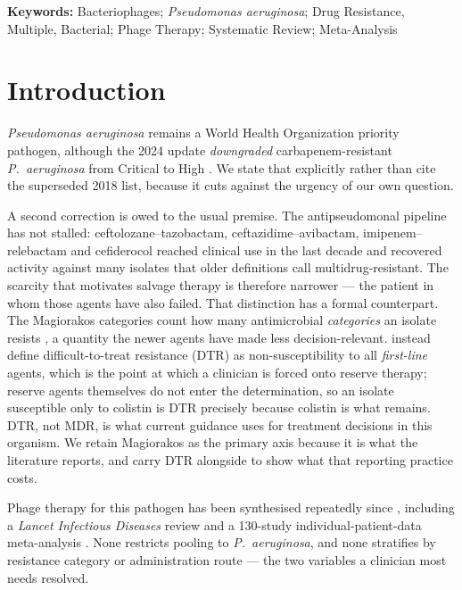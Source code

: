 \documentclass[12pt]{article}
\begin{document}
\vspace{1em}
\noindent\textbf{Keywords:} Bacteriophages; \textit{Pseudomonas aeruginosa}; Drug Resistance, Multiple, Bacterial; Phage Therapy; Systematic Review; Meta-Analysis

\newpage
\setcounter{page}{1}

\section{Introduction}

\textit{Pseudomonas aeruginosa} remains a World Health Organization priority pathogen, although the 2024 update \emph{downgraded} carbapenem-resistant \textit{P.\ aeruginosa} from Critical to High \parencite{WHO2024_bppl,Tacconelli2018_who}. We state that explicitly rather than cite the superseded 2018 list, because it cuts against the urgency of our own question.

A second correction is owed to the usual premise. The antipseudomonal pipeline has not stalled: ceftolozane--tazobactam, ceftazidime--avibactam, imipenem--relebactam and cefiderocol reached clinical use in the last decade and recovered activity against many isolates that older definitions call multidrug-resistant. The scarcity that motivates salvage therapy is therefore narrower --- the patient in whom those agents have also failed. That distinction has a formal counterpart. The Magiorakos categories count how many antimicrobial \emph{categories} an isolate resists \parencite{Magiorakos2012_mdrxdr}, a quantity the newer agents have made less decision-relevant. \textcite{Kadri2018_dtr} instead define difficult-to-treat resistance (DTR) as non-susceptibility to all \emph{first-line} agents, which is the point at which a clinician is forced onto reserve therapy; reserve agents themselves do not enter the determination, so an isolate susceptible only to colistin is DTR precisely because colistin is what remains. DTR, not MDR, is what current guidance uses for treatment decisions in this organism. We retain Magiorakos as the primary axis because it is what the literature reports, and carry DTR alongside to show what that reporting practice costs.

Phage therapy for this pathogen has been synthesised repeatedly since \textcite{ElHaddad2019_eskape}, including a \textit{Lancet Infectious Diseases} review \parencite{Uyttebroek2022_lancetid} and a 130-study individual-patient-data meta-analysis \parencite{Liu2025_ijaa}. None restricts pooling to \textit{P.\ aeruginosa}, and none stratifies by resistance category or administration route --- the two variables a clinician most needs resolved.
\end{document}
